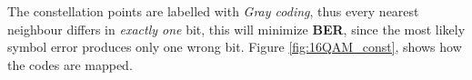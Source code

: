 The constellation points are labelled with \emph{Gray coding}, thus every nearest neighbour differs in \emph{exactly one} bit, this will minimize \textbf{BER}, since the most likely symbol error produces only one wrong bit. Figure \ref{fig:16QAM_const}, shows how the codes are mapped.

